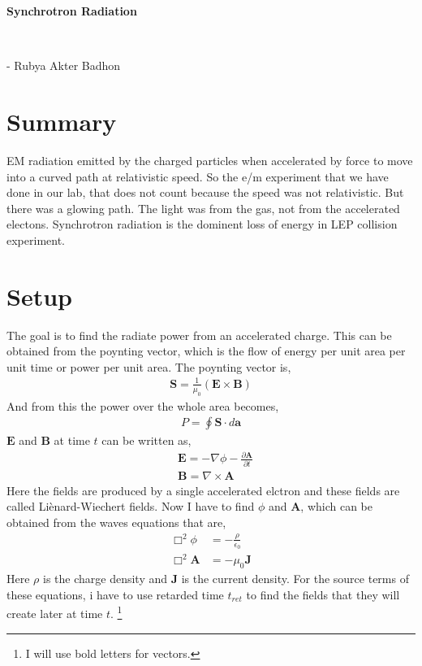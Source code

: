\documentclass[11pt,a4paper]{article}
\author{}
\date{}
\begin{document}
\begin{center}
\begin{huge}
        \textbf{Synchrotron Radiation}
\end{huge} \\ \vspace{0.3cm}
\begin{small}
    - Rubya Akter Badhon    
\end{small}
\end{center}

\section*{Summary} EM radiation emitted by the charged particles when accelerated by force to move into a curved path at relativistic speed. 
So the e/m experiment that we have done in our lab, that does not count because the speed was not relativistic. But there was a glowing path. 
The light was from the gas, not from the accelerated electons. Synchrotron radiation is the dominent loss of energy in LEP collision experiment.

\section*{Setup}
The goal is to find the radiate power from an accelerated charge. 
This can be obtained from the poynting vector, which is the flow of energy per unit area per unit time or power per unit area. 
The poynting vector is,
\begin{align*}
    \mathbf{S} = \frac{1}{\mu_0}(\mathbf{E} \times \mathbf{B})
\end{align*}
And from this the power over the whole area becomes,
\begin{align*}
    P = \oint \mathbf{S} \cdot d\mathbf{a}
\end{align*}
$\mathbf{E}$ and $\mathbf{B}$ at time $t$ can be written as,
\begin{align*}
    & \mathbf{E} = -\nabla \phi - \frac{\partial \mathbf{A}}{\partial t} \\
    & \mathbf{B} = \nabla \times \mathbf{A}
\end{align*}
Here the fields are produced by a single accelerated elctron and these fields are called Li\`enard-Wiechert fields. 
Now I have to find $\phi$ and $\mathbf{A}$, which can be obtained from the waves equations that are,
\begin{align*}
    \Box^2 \phi &= -\frac{\rho}{\epsilon_0} \\
    \Box^2 \mathbf{A} &= -\mu_0 \mathbf{J}
\end{align*}
Here $\rho$ is the charge density and $\mathbf{J}$ is the current density. 
For the source terms of these equations, i have to use retarded time $t_{ret}$ to find the fields that they will create later at time $t$. 
\footnote{I will use bold letters for vectors.}
\newpage
\end{document}
